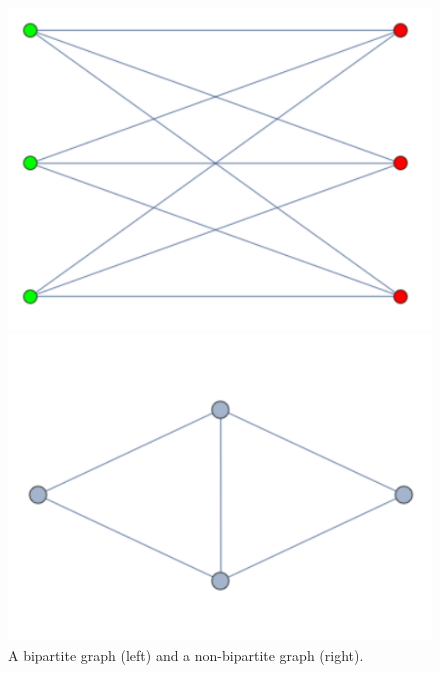 \documentclass[11pt, notitlepage]{report}
\begin{document}
	\begin{figure}[hpb]
\begin{minipage}{0.49\textwidth}
	\centering
	\includegraphics[scale=.6]{k_3_3}
\end{minipage}
\begin{minipage}{0.49\textwidth}
	\centering
	\includegraphics[scale=.3]{non-bipartite}
\end{minipage}
\caption{A bipartite graph (left) and a non-bipartite graph (right).}
	\label{fig:bipartite}
	\end{figure}
\end{document}
